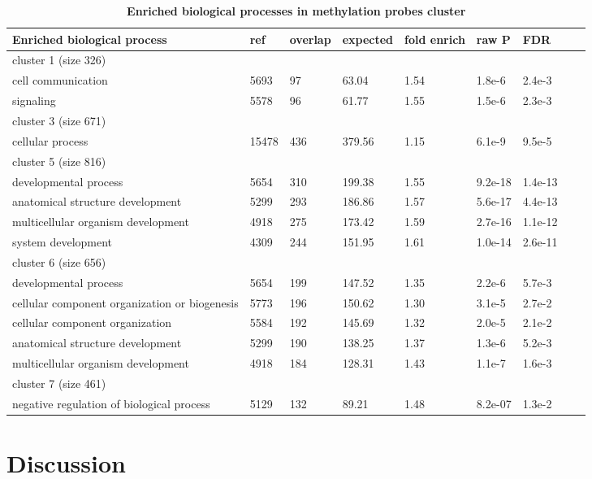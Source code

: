 \documentclass{article}
\begin{document}
\begin{table*}[ht!]
\centering
\begin{tabular}{lllllllll}
  \toprule
Enriched biological process & ref & overlap & expected & fold enrich & raw P & FDR \\ 
  \midrule
  cluster 1 (size 326) \\
  \midrule
  cell communication & 5693 &  97 & 63.04 & 1.54 & 1.8e-6 & 2.4e-3 \\ 
  signaling & 5578 &  96 & 61.77 & 1.55 & 1.5e-6 & 2.3e-3 \\ 
   \midrule
   cluster 3 (size 671) \\
   \midrule
     cellular process & 15478 & 436 & 379.56 & 1.15 & 6.1e-9 & 9.5e-5 \\ 
\midrule
  cluster 5 (size 816)\\
  \midrule
  developmental process  & 5654 & 310 & 199.38 & 1.55 & 9.2e-18 & 1.4e-13 \\ 
  anatomical structure development & 5299 & 293 & 186.86 & 1.57 & 5.6e-17 & 4.4e-13 \\ 
  multicellular organism development & 4918 & 275 & 173.42 & 1.59 & 2.7e-16 & 1.1e-12 \\ 
  system development & 4309 & 244 & 151.95 & 1.61 & 1.0e-14 & 2.6e-11 \\ 
     \midrule
   cluster 6 (size 656)\\
  \midrule
  developmental process & 5654 & 199 & 147.52 & 1.35 & 2.2e-6 & 5.7e-3 \\ 
  cellular component organization or biogenesis & 5773 & 196 & 150.62 & 1.30 & 3.1e-5 & 2.7e-2 \\ 
  cellular component organization & 5584 & 192 & 145.69 & 1.32 & 2.0e-5 & 2.1e-2 \\ 
  anatomical structure development & 5299 & 190 & 138.25 & 1.37 & 1.3e-6 & 5.2e-3 \\ 
  multicellular organism development & 4918 & 184 & 128.31 & 1.43 & 1.1e-7 & 1.6e-3 \\ 
     \midrule
     cluster 7 (size 461) \\
     \midrule
     negative regulation of biological process & 5129 & 132 & 89.21 & 1.48 & 8.2e-07 & 1.3e-2 \\ 
	\bottomrule
\end{tabular}
\caption{\textbf{Enriched biological processes in \citet{figueroa2010dna} methylation probes cluster} }
\label{enriched}
\end{table*}



\section{Discussion}



\end{document}
